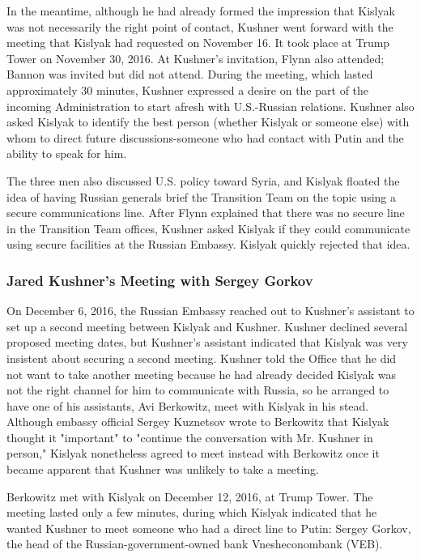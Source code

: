 In the meantime, although he had already formed the impression that Kislyak was not necessarily the right point of contact,%
Kushner went forward with the meeting that Kislyak had requested on November 16. It took place at Trump Tower on November 30, 2016.%
At Kushner's invitation, Flynn also attended; Bannon was invited but did not attend.%
During the meeting, which lasted approximately 30 minutes, Kushner expressed a desire on the part of the incoming Administration to start afresh with U.S.-Russian relations.%
Kushner also asked Kislyak to identify the best person (whether Kislyak or someone else) with whom to direct future discussions-someone who had contact with Putin and the ability to speak for him.%

The three men also discussed U.S. policy toward Syria, and Kislyak floated the idea of having Russian generals brief the Transition Team on the topic using a secure communications line.%
After Flynn explained that there was no secure line in the Transition Team offices, Kushner asked Kislyak if they could communicate using secure facilities at the Russian Embassy.%
Kislyak quickly rejected that idea.%

\subsubsection{Jared Kushner's Meeting with Sergey Gorkov}

On December 6, 2016, the Russian Embassy reached out to Kushner's assistant to set up a second meeting between Kislyak and Kushner.%
Kushner declined several proposed meeting dates, but Kushner's assistant indicated that Kislyak was very insistent about securing a second meeting.%
Kushner told the Office that he did not want to take another meeting because he had already decided Kislyak was not the right channel for him to communicate with Russia, so he arranged to have one of his assistants, Avi Berkowitz, meet with Kislyak in his stead.%
Although embassy official Sergey Kuznetsov wrote to Berkowitz that Kislyak thought it "important" to "continue the conversation with Mr. Kushner in person,"%
Kislyak nonetheless agreed to meet instead with Berkowitz once it became apparent that Kushner was unlikely to take a meeting.

Berkowitz met with Kislyak on December 12, 2016, at Trump Tower.%
The meeting lasted only a few minutes, during which Kislyak indicated that he wanted Kushner to meet someone who had a direct line to Putin: Sergey Gorkov, the head of the Russian-government-owned bank Vnesheconombank (VEB).

